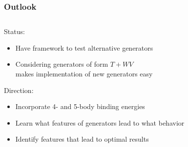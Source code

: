 \documentclass[accentcolor=tud2c,usenames,dvipsnames,colorbacktitle,inverttitle,landscape,german,presentation,t]{tudbeamer}
\begin{document}
  \begin{frame}
    \frametitle{Outlook}
    \begin{columns}[c]
      \begin{column}{0.8\textwidth}
        Status:
        \begin{itemize}
          \item Have framework to test alternative generators
          \item Considering generators of form $T + WV$ \\ makes implementation of new generators easy
        \end{itemize}
        Direction:
        \begin{itemize}
          \item Incorporate 4- and 5-body binding energies
          \item Learn what features of generators lead to what behavior
          \item Identify features that lead to optimal results
        \end{itemize}
      \end{column}
    \end{columns}
  \end{frame}
\end{document}
